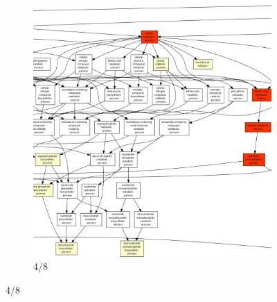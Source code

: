 \begin{figure}[p]
\ContinuedFloat
\begin{subfigure}{\textwidth}
\includegraphics[width=\textwidth]
{Figures/hlc-go-all-graph/hlc-go-all-graph_3.png}
\caption{4/8}
\end{subfigure}
\end{figure}

